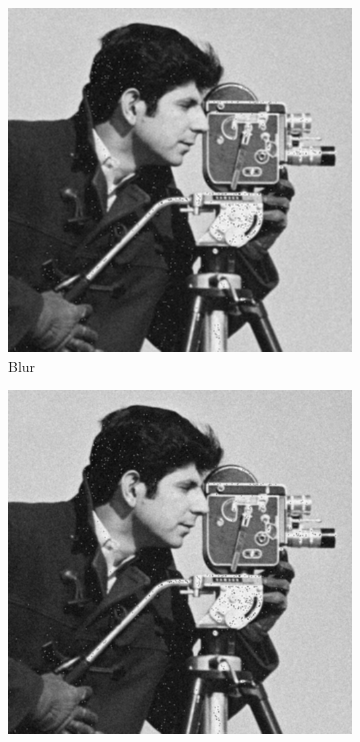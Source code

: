 \documentclass{article}\raggedbottom
\begin{document}
\begin{figure}[H]
	\centering
	\begin{subfigure}[b]{0.45\linewidth}
		\includegraphics[width=\linewidth]{../../2_Software/data/blur_g.png}
		\caption{Blur}
	\end{subfigure}
	\begin{subfigure}[b]{0.45\linewidth}
		\includegraphics[width=\linewidth]{../../2_Software/data/gblur_g.png}

\end{subfigure}
\end{figure}
\end{document}
